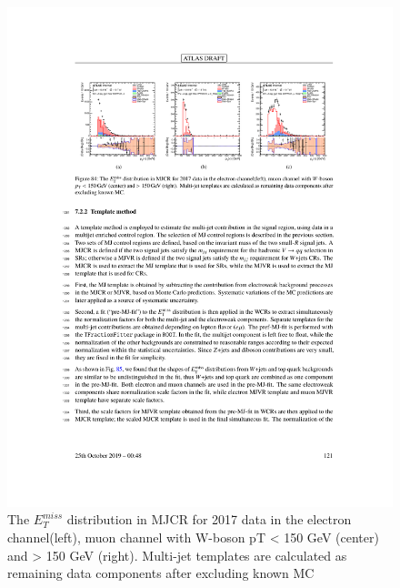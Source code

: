 \begin{figure}[h!]
  \centering
  \includegraphics[width=\hsize]{figures/Analysis/multijet/multijet_met.pdf}
      \caption{The $E_{T}^{miss}$ distribution in MJCR for 2017 data in the electron channel(left), muon channel with W-boson pT < 150 GeV (center) and > 150 GeV (right). Multi-jet templates are calculated as remaining data components after excluding known MC} 
  \label{fig:multijet_met}
\end{figure} 
\FloatBarrier



